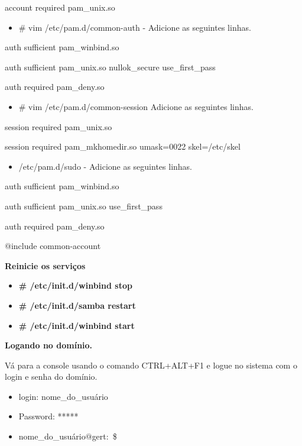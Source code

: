account required         pam\_unix.so

\begin{itemize}
	\item {\# vim /etc/pam.d/common-auth} - Adicione as seguintes linhas.
\end{itemize}

auth sufficient pam\_winbind.so

auth sufficient pam\_unix.so nullok\_secure use\_first\_pass

auth required   pam\_deny.so

\begin{itemize}
	\item {\# vim /etc/pam.d/common-session} Adicione as seguintes linhas.
\end{itemize}

session required pam\_unix.so

session required pam\_mkhomedir.so umask=0022 skel=/etc/skel

\begin{itemize}
	\item {/etc/pam.d/sudo} - Adicione as seguintes linhas.
\end{itemize}

auth sufficient pam\_winbind.so

auth sufficient pam\_unix.so use\_first\_pass

auth required   pam\_deny.so

$@$include common-account

\textbf{Reinicie os serviços}

\begin{itemize}
	\item \textbf{\# /etc/init.d/winbind stop}
	\item \textbf{\# /etc/init.d/samba restart}
	\item \textbf{\# /etc/init.d/winbind start}
\end{itemize}

\textbf{Logando no domínio.}

Vá para a console usando o comando CTRL+ALT+F1 e logue no sistema com o login e senha do domínio.

\begin{itemize}
	\item {login: nome\_do\_usuário}
	\item {Password: *****}
	\item {nome\_do\_usuário$@$gert:~\$}
\end{itemize}

